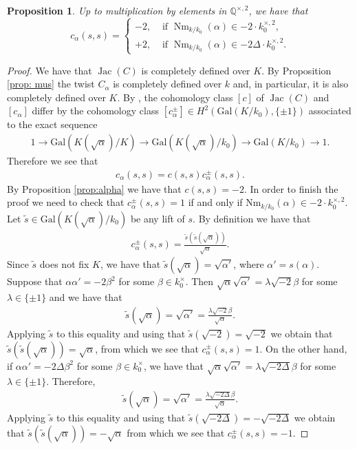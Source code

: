 \documentclass[oneside]{amsart}
\newtheorem{proposition}[theorem]{Proposition}
\theoremstyle{remark}
\newcommand{\on}{\operatorname }
\newcommand{\lra}{\longrightarrow}
\newcommand{\Q}{\mathbb Q}
\newcommand{\Gal}{\mathrm{Gal}}
\newcommand{\Jac}{\operatorname{Jac}}
\numberwithin{equation}{section}
\begin{document}
\begin{proposition}\label{prop:compcocyle} Up to multiplication by elements in $\Q^{\times,2}$, we have that
  \[
    c_\alpha({s}, {s}) = \begin{cases}
    -2,&\text{ if }\on{Nm}_{k/k_0}(\alpha) \in -2\cdot k_0^{\times,2},\\
    +2,&\text{ if }\on{Nm}_{k/k_0}(\alpha) \in -2\Delta\cdot k_0^{\times,2}.
    \end{cases}
\]
\end{proposition}
\begin{proof}
  We have that $\Jac(C)$ is completely defined over $K$. By Proposition \ref{prop: mus} the twist $C_\alpha$ is completely defined over $k$ and, in particular, it is also completely defined over $K$. By \cite[Lemma 6.1]{GQ14}, the cohomology class $[c]$ of $\Jac(C)$ and $[c_\alpha]$ differ by the cohomology class  $[c_\alpha^\pm]\in H^2(\Gal(K/k_0),\{\pm 1\})$ associated to the exact sequence
  \begin{align*}
    1 \lra \Gal(K(\sqrt{\alpha})/K)\lra \Gal(K(\sqrt{\alpha})/k_0)\lra \Gal(K/k_0)\lra 1.
  \end{align*}
  Therefore we see that
  \begin{align*}
    c_\alpha({s},{s}) = c({s},{s})c_\alpha^{\pm} ({s},{s}).
  \end{align*} 
  By Proposition \ref{prop:alpha} we have that $c({s},{s})=-2$. In order to finish the proof we need to check that $c_\alpha^\pm(s,s)=1$ if and only if $\mathrm{Nm}_{k/k_0}(\alpha) \in -2\cdot k_0^{\times,2}$. Let $\tilde{s} \in\Gal(K(\sqrt{\alpha})/k_0)$ be any lift of ${s}$. By definition we have that
  \begin{align*}
    c_\alpha^{\pm}({s},{s}) = \frac{\tilde{s}(\tilde{s}(\sqrt{\alpha}))}{\sqrt{\alpha}}.
  \end{align*}
  Since $\tilde{s}$ does not fix $K$, we have that $\tilde{s} (\sqrt{\alpha})=\sqrt{\alpha'}$, where $\alpha'={s}(\alpha)$. Suppose that $\alpha\alpha'=-2\beta^2$ for some $\beta\in k_0^\times$. Then $\sqrt{\alpha}\sqrt{\alpha'}=\lambda \sqrt{-2}\beta$ for some $\lambda\in \{\pm 1\}$ and we have that
  \begin{align*}
    \tilde{s}(\sqrt{\alpha}) = \sqrt{\alpha'} = \frac{\lambda \sqrt{-2} \beta}{\sqrt{\alpha}}.
  \end{align*}
  Applying $\tilde{s}$ to this equality and using that $\tilde{s}(\sqrt{-2})=\sqrt{-2}$ we obtain that $\tilde{s}(\tilde{s}(\sqrt{\alpha}))= \sqrt{\alpha}$, from which we see that $c_\alpha^\pm({s},{s})=1$. On the other hand, if $\alpha\alpha'=-2\Delta \beta^2$ for some $\beta\in k_0^\times$, we have that $\sqrt{\alpha}\sqrt{\alpha'}=\lambda \sqrt{-2\Delta}\beta$ for some $\lambda\in \{\pm 1\}$. Therefore,
  \begin{align*}
    \tilde{s}(\sqrt{\alpha}) = \sqrt{\alpha'} = \frac{\lambda \sqrt{-2\Delta} \beta}{\sqrt{\alpha}}.
  \end{align*}
  Applying $\tilde{s}$ to this equality and using that $\tilde{s}(\sqrt{-2\Delta})=-\sqrt{-2\Delta}$ we obtain that $\tilde{s}(\tilde{s}(\sqrt{\alpha}))= -\sqrt{\alpha}$ from which we see that $c_\alpha^\pm({s},{s})=-1$.
  
\end{proof}
\end{document}
